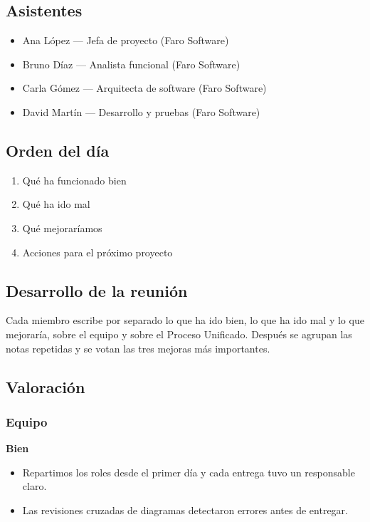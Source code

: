\documentclass[11pt,a4paper]{article}
\begin{document}
\subsection*{Asistentes}

\begin{itemize}
\item Ana López — Jefa de proyecto (Faro Software)
\item Bruno Díaz — Analista funcional (Faro Software)
\item Carla Gómez — Arquitecta de software (Faro Software)
\item David Martín — Desarrollo y pruebas (Faro Software)
\end{itemize}

\subsection*{Orden del día}

\begin{enumerate}
\item Qué ha funcionado bien
\item Qué ha ido mal
\item Qué mejoraríamos
\item Acciones para el próximo proyecto
\end{enumerate}

\subsection*{Desarrollo de la reunión}

Cada miembro escribe por separado lo que ha ido bien, lo que ha ido mal y lo que mejoraría, sobre el equipo y sobre el Proceso Unificado. Después se agrupan las notas repetidas y se votan las tres mejoras más importantes.

\subsection*{Valoración}

\subsubsection*{Equipo}

\textbf{Bien}

\begin{itemize}
\item Repartimos los roles desde el primer día y cada entrega tuvo un responsable claro.
\item Las revisiones cruzadas de diagramas detectaron errores antes de entregar.
\end{itemize}
\end{document}
